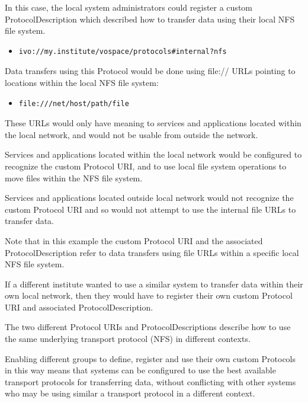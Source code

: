 \documentclass[11pt,a4paper]{ivoa}
\begin{document}
In this case, the local system administrators could register a custom ProtocolDescription which described how to transfer data using their local NFS file system.

\begin{itemize}
    \item \begin{verbatim}ivo://my.institute/vospace/protocols#internal?nfs\end{verbatim}
\end{itemize}

Data transfers using this Protocol would be done using file:// URLs pointing to locations within the local NFS file system:

\begin{itemize}
    \item \begin{verbatim}file:///net/host/path/file\end{verbatim}
\end{itemize}

These URLs would only have meaning to services and applications located within the local network, and would not be usable from outside the network.

Services and applications located within the local network would be configured to recognize the custom Protocol URI, and to use local file system operations to move files within the NFS file system.

Services and applications located outside local network would not recognize the custom Protocol URI and so would not attempt to use the internal file URLs to transfer data.

Note that in this example the custom Protocol URI and the associated ProtocolDescription refer to data transfers using file URLs within a specific local NFS file system.

If a different institute wanted to use a similar system to transfer data within their own local network, then they would have to register their own custom Protocol URI and associated ProtocolDescription.

The two different Protocol URIs and ProtocolDescriptions describe how to use the same underlying transport protocol (NFS) in different contexts.

Enabling different groups to define, register and use their own custom Protocols in this way means that systems can be configured to use the best available transport protocols for transferring data, without conflicting with other systems who may be using similar a transport protocol in a different context.
\end{document}
